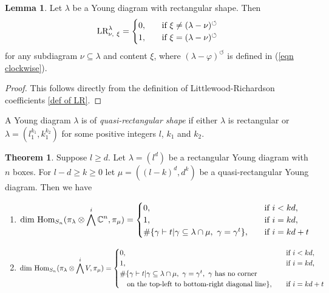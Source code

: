 \documentclass[11pt]{amsart}
\numberwithin{equation}{section}
\theoremstyle{definition}
\newtheorem{theorem}[thm]{Theorem}
\newtheorem{lemma}[thm]{Lemma}
\renewcommand{\phi}{\varphi}
\begin{document}
\begin{lemma}\label{lem: lr coef for rectangular}
Let $\lambda$ be a Young diagram with rectangular shape. Then
\begin{equation}
    \textnormal{LR}^{\lambda}_{\nu,\ \xi}=
    \begin{cases}
        0,\quad & \textnormal{if}\  \xi\neq(\lambda-\nu)^{\circlearrowleft}\\
        1,\quad &  \textnormal{if}\ \xi=(\lambda-\nu)^{\circlearrowleft}
    \end{cases}
\end{equation}
 for any subdiagram $\nu\subseteq\lambda$ and content $\xi$, where $(\lambda-\phi)^{\circlearrowleft}$ is defined in (\ref{eqn clockwise}). 
\end{lemma}

\begin{proof}
    This follows directly from the definition of Littlewood-Richardson coefficients \eqref{def of LR}.
\end{proof}


A Young diagram $\lambda$ is of \emph{quasi-rectangular shape} if either  \(\lambda\) is rectangular or \(\lambda=(l_{1}^{k_1},k_{1}^{k_2})\) for some positive integers $l$, $k_1$ and $k_2$.


\begin{theorem}\label{dim of Hom}
   Suppose $l\geq d$. Let $\lambda=(l^{d})$ be a rectangular Young diagram with $n$ boxes. For $l-d\geq k\geq0$  let $\mu=((l-k)^{d},d^{k})$ be a quasi-rectangular Young diagram. Then we have
    \begin{enumerate}
        \item 
        \begin{eqnarray*}
        \textnormal{dim Hom}_{S_{n}}(\pi_{\lambda}\otimes\bigwedge^{i}\mathbb{C}^{n},\pi_{\mu})=\begin{cases}
            0,\quad & \textnormal{if}\ i<kd,\\
            1,\quad& \textnormal{if}\ i=kd,\\
            \#\{\gamma\vdash t|\gamma\subseteq\lambda\cap\mu,\ \gamma=\gamma^{t}\},\quad& \textnormal{if}\ i=kd+t
        \end{cases}
        \end{eqnarray*}
        
        \item 
        \begin{eqnarray*}
        \textnormal{dim Hom}_{S_{n}}(\pi_{\lambda}\otimes\bigwedge^{i}V,\pi_{\mu})=\begin{cases}
            0,\quad & \textnormal{if}\ i<kd,\\
            1,\quad& \textnormal{if}\ i=kd,\\
            \#\{\gamma\vdash t|\gamma\subseteq\lambda\cap\mu,\ \gamma=\gamma^{t},\  \gamma\ \textnormal{has no corner}\\
            \quad\textnormal{on the top-left to bottom-right diagonal line}\},\quad& \textnormal{if}\ i=kd+t
        \end{cases}
        \end{eqnarray*}
    \end{enumerate}
\end{theorem}
\end{document}
